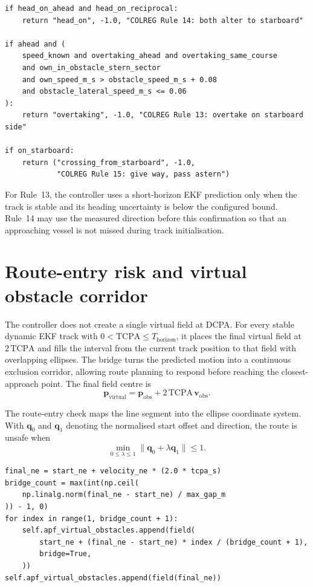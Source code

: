 \documentclass[11pt,a4paper]{article}
\begin{document}
\begin{lstlisting}
if head_on_ahead and head_on_reciprocal:
    return "head_on", -1.0, "COLREG Rule 14: both alter to starboard"

if ahead and (
    speed_known and overtaking_ahead and overtaking_same_course
    and own_in_obstacle_stern_sector
    and own_speed_m_s > obstacle_speed_m_s + 0.08
    and obstacle_lateral_speed_m_s <= 0.06
):
    return "overtaking", -1.0, "COLREG Rule 13: overtake on starboard side"

if on_starboard:
    return ("crossing_from_starboard", -1.0,
            "COLREG Rule 15: give way, pass astern")
\end{lstlisting}

For Rule~13, the controller uses a short-horizon EKF prediction only when the
track is stable and its heading uncertainty is below the configured bound.
Rule~14 may use the measured direction before this confirmation so that an
approaching vessel is not missed during track initialisation.

\section{Route-entry risk and virtual obstacle corridor}

The controller does not create a single virtual field at DCPA. For every
stable dynamic EKF track with $0<\mathrm{TCPA}\leq T_{\mathrm{horizon}}$, it
places the final virtual field at $2\,\mathrm{TCPA}$ and fills the interval
from the current track position to that field with overlapping ellipses. The
bridge turns the predicted motion into a continuous exclusion corridor,
allowing route planning to respond before reaching the closest-approach point.
The final field centre is
\begin{equation}
\bm{p}_{\mathrm{virtual}}=
\bm{p}_{\mathrm{obs}}+2\,\mathrm{TCPA}\,\bm{v}_{\mathrm{obs}}.
\end{equation}

The route-entry check maps the line segment into the ellipse coordinate
system. With $\bm{q}_0$ and $\bm{q}_1$ denoting the normalised start offset
and direction, the route is unsafe when
\begin{equation}
\min_{0\leq\lambda\leq1}\lVert\bm{q}_0+\lambda\bm{q}_1\rVert\leq1.
\end{equation}

\begin{lstlisting}
final_ne = start_ne + velocity_ne * (2.0 * tcpa_s)
bridge_count = max(int(np.ceil(
    np.linalg.norm(final_ne - start_ne) / max_gap_m
)) - 1, 0)
for index in range(1, bridge_count + 1):
    self.apf_virtual_obstacles.append(field(
        start_ne + (final_ne - start_ne) * index / (bridge_count + 1),
        bridge=True,
    ))
self.apf_virtual_obstacles.append(field(final_ne))
\end{lstlisting}
\end{document}
